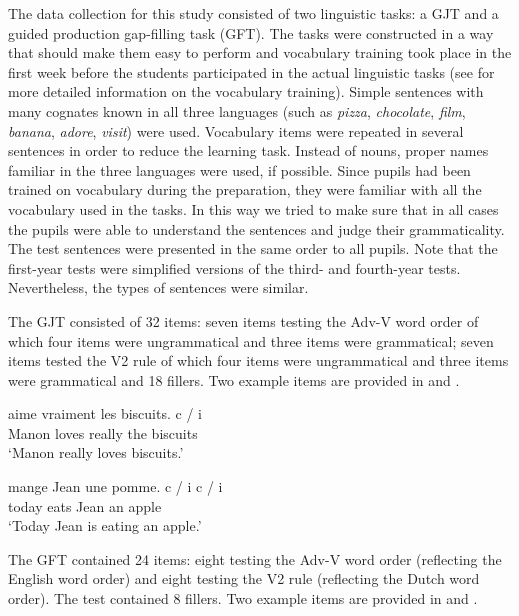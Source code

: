 \documentclass[output=paper,modfonts,nonflat, newtxmath]{langsci/langscibook}
\begin{document}
The data collection for this study consisted of two linguistic tasks: a GJT and a guided production gap-filling task (GFT). The tasks were constructed in a way that should make them easy to perform and vocabulary training took place in the first week before the students participated in the actual linguistic tasks (see  for more detailed information on the vocabulary training). Simple sentences with many cognates known in all three languages (such as \textit{pizza}, \textit{chocolate}, \textit{film}, \textit{banana}, \textit{adore}, \textit{visit}) were used. Vocabulary items were repeated in several sentences in order to reduce the learning task. Instead of nouns, proper names familiar in the three languages were used, if possible. Since pupils had been trained on vocabulary during the preparation, they were familiar with all the vocabulary used in the tasks. In this way we tried to make sure that in all cases the pupils were able to understand the sentences and judge their grammaticality. The test sentences were presented in the same order to all pupils. Note that the first-year tests were simplified versions of the third- and fourth-year tests. Nevertheless, the types of sentences were similar.

The GJT consisted of 32 items: seven items testing the Adv-V word order of which four items were ungrammatical and three items were grammatical; seven items tested the V2 rule of which four items were ungrammatical and three items were grammatical and 18 fillers. Two example items are provided in  and .

  \ea%
  \label{ex:stadt:2}
   {aime} {vraiment} {les} {biscuits.}    c / i\\
  		Manon loves really     the biscuits\\
  \glt ‘Manon really loves biscuits.’
  \z

  \ea%
  \label{ex:stadt:3}
   {mange} {Jean} {une} {pomme.}  c / i   c / i\\
		  today eats Jean an apple\\
  \glt ‘Today Jean is eating an apple.’
  \z



The GFT contained 24 items: eight testing the Adv-V word order (reflecting the English word order) and eight testing the V2 rule (reflecting the Dutch word order). The test contained 8 fillers. Two example items are provided in  and .
\end{document}
